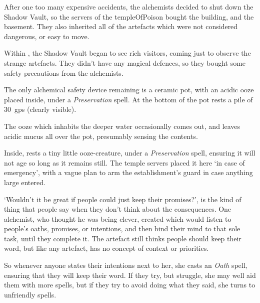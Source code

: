 \begin{multicols}{2}
\showStdSpells[
  \setcounter{diceNo}{0}
]


\begin{exampletext}
  After one too many expensive accidents, the alchemists decided to shut down the Shadow Vault, so the \glspl{server} of the \gls{templeOfPoison} bought the building, and the basement.
  They also inherited all of the \glspl{artefact} which were not considered dangerous, or easy to move.

  Within , the Shadow Vault began to see rich visitors, coming just to observe the strange \glspl{artefact}.
  They didn't have any magical defences, so they bought some safety precautions from the alchemists.
\end{exampletext}

The only alchemical safety device remaining is a ceramic pot, with an acidic ooze placed inside, under a \textit{Preservation} spell.
At the bottom of the pot rests a pile of 30~\glspl{gp} (clearly visible).

The ooze which inhabits the deeper water  occasionally comes out, and leaves acidic mucus all over the pot, presumably sensing the contents.

Inside, rests a tiny little ooze-creature, under a \textit{Preservation} spell, ensuring it will not age so long as it remains still.
The temple \glspl{server} placed it here `in case of emergency', with a vague plan to arm the establishment's guard in case anything large entered.


\jelly[1]


\begin{exampletext}
  `Wouldn't it be great if people could just keep their promises?', is the kind of thing that people say when they don't think about the consequences.
  One alchemist, who thought he was being clever, created  which would listen to people's oaths, promises, or intentions, and then bind their mind to that sole task, until they complete it.
  The \gls{artefact} still thinks people should keep their word, but like any \gls{artefact}, has no concept of context or priorities.

  So whenever anyone states their intentions next to her, she casts an \textit{Oath} spell, ensuring that they will keep their word.
  If they try, but struggle, she may well aid them with more spells, but if they try to avoid doing what they said, she turns to unfriendly spells.


\end{exampletext}
\end{multicols}
